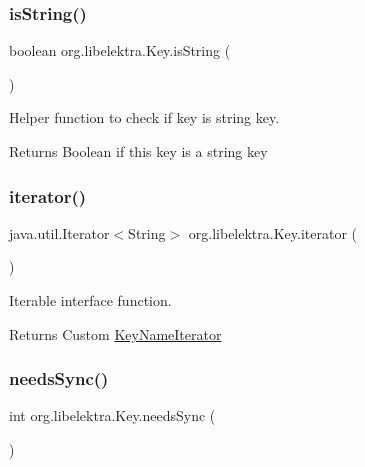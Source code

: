 \subsubsection{\texorpdfstring{is\+String()}{isString()}}
{\footnotesize\ttfamily boolean org.\+libelektra.\+Key.\+is\+String (\begin{DoxyParamCaption}{ }\end{DoxyParamCaption})\hspace{0.3cm}{\ttfamily [inline]}}



Helper function to check if key is string key. 

\begin{DoxyReturn}{Returns}
Boolean if this key is a string key 
\end{DoxyReturn}
\mbox{\label{classorg_1_1libelektra_1_1Key_ad948a4ab2d5142b439830ddc5c16cc38}} 
\subsubsection{\texorpdfstring{iterator()}{iterator()}}
{\footnotesize\ttfamily java.\+util.\+Iterator$<$String$>$ org.\+libelektra.\+Key.\+iterator (\begin{DoxyParamCaption}{ }\end{DoxyParamCaption})\hspace{0.3cm}{\ttfamily [inline]}}



Iterable interface function. 

\begin{DoxyReturn}{Returns}
Custom \hyperlink{classorg_1_1libelektra_1_1KeyNameIterator}{Key\+Name\+Iterator} 
\end{DoxyReturn}
\mbox{\label{classorg_1_1libelektra_1_1Key_a6f5afab907a28b264af0981e9db58c64}} 
\subsubsection{\texorpdfstring{needs\+Sync()}{needsSync()}}
{\footnotesize\ttfamily int org.\+libelektra.\+Key.\+needs\+Sync (\begin{DoxyParamCaption}{ }\end{DoxyParamCaption})\hspace{0.3cm}{\ttfamily [inline]}}



